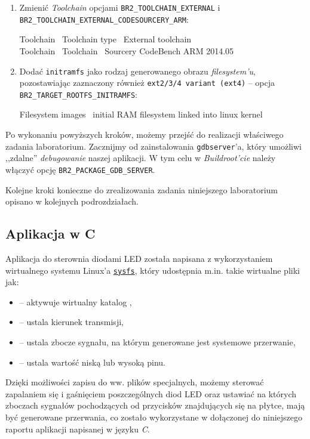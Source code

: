 \documentclass{article}
\newenvironment{ttblock}{\ttfamily}{\par}
\begin{document}
\begin{enumerate}
\item Zmienić \emph{Toolchain} opcjami \texttt{BR2\_TOOLCHAIN\_EXTERNAL} i\\ \texttt{BR2\_TOOLCHAIN\_EXTERNAL\_CODESOURCERY\_ARM}:

\begin{ttblock}
Toolchain \textrightarrow\ Toolchain type \textrightarrow\ External toolchain\\
Toolchain \textrightarrow\ Toolchain \textrightarrow\ Sourcery CodeBench ARM 2014.05
\end{ttblock}

\item Dodać \texttt{initramfs} jako rodzaj generowanego obrazu \emph{filesystem'u}, pozostawiając zaznaczony również \texttt{ext2/3/4 variant (ext4)} -- opcja \\\texttt{BR2\_TARGET\_ROOTFS\_INITRAMFS}:

\begin{ttblock}
Filesystem images \textrightarrow\ initial RAM filesystem linked into linux kernel
\end{ttblock}
\end{enumerate}

Po wykonaniu powyższych kroków, możemy przejść do realizacji właściwego zadania laboratorium. Zacznijmy od zainstalowania \texttt{gdbserver}'a, który umożliwi ,,zdalne'' \emph{debugowanie} naszej aplikacji. W tym celu w \emph{Buildroot'cie} należy włączyć opcję \texttt{BR2\_PACKAGE\_GDB\_SERVER}.

Kolejne kroki konieczne do zrealizowania zadania niniejszego laboratorium opisano w kolejnych podrozdziałach.


\subsection{Aplikacja w C}

Aplikacja do sterownia diodami LED została napisana z wykorzystaniem wirtualnego systemu Linux'a \href{https://www.kernel.org/doc/Documentation/filesystems/sysfs.txt}{\texttt{sysfs}}, który udostępnia m.in. takie wirtualne pliki jak:
\begin{itemize}
\item {} -- aktywuje wirtualny katalog ,
\item {} -- ustala kierunek transmisji,
\item {} -- ustala zbocze sygnału, na którym generowane jest systemowe przerwanie,
\item {} -- ustala wartość niską lub wysoką pinu.
\end{itemize}
Dzięki możliwości zapisu do ww. plików specjalnych, możemy sterować zapalaniem się i gaśnięciem poszczególnych diod LED oraz ustawiać na których zboczach sygnałów pochodzących od przycisków znajdujących się na płytce, mają być generowane przerwania, co zostało wykorzystane w dołączonej do niniejszego raportu aplikacji napisanej w języku \emph{C}.
\end{document}
